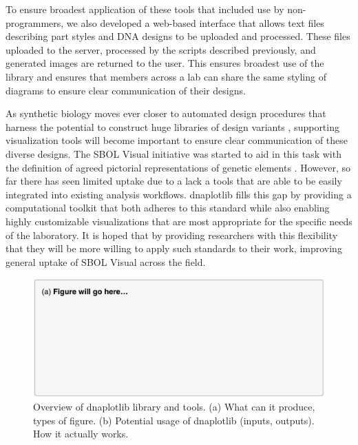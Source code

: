 \documentclass{bioinfo}
\begin{document}
To ensure broadest application of these tools that included use by non-programmers, we also developed a web-based interface that allows text files describing part styles and DNA designs to be uploaded and processed. These files uploaded to the server, processed by the scripts described previously, and generated images are returned to the user. This ensures broadest use of the library and ensures that members across a lab can share the same styling of diagrams to ensure clear communication of their designs.


As synthetic biology moves ever closer to automated design procedures that harness the potential to construct huge libraries of design variants \citep{Smanski14a,Bilitchenko11a}, supporting visualization tools will become important to ensure clear communication of these diverse designs. The SBOL Visual initiative was started to aid in this task with the definition of agreed pictorial representations of genetic elements \citep{Quinn13a}. However, so far there has seen limited uptake due to a lack a tools that are able to be easily integrated into existing analysis workflows. dnaplotlib fills this gap by providing a computational toolkit that both adheres to this standard while also enabling highly customizable visualizations that are most appropriate for the specific needs of the laboratory. It is hoped that by providing researchers with this flexibility that they will be more willing to apply such standards to their work, improving general uptake of SBOL Visual across the field.

\begin{figure}[t]
\centering
\includegraphics[width=\textwidth]{Figure1.pdf}
\caption{\label{fig:overview}Overview of dnaplotlib library and tools. (a) What can it produce, types of figure. (b) Potential usage of dnaplotlib (inputs, outputs). How it actually works.}
\end{figure}
\end{document}
